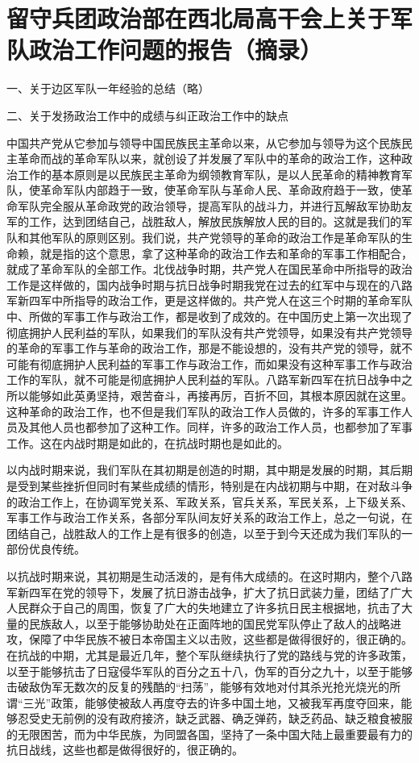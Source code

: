 \section[留守兵团政治部在西北局高干会上关于军队政治工作问题的报告（摘录）（一九四四年四月）]{留守兵团政治部在西北局高干会上关于军队政治工作问题的报告（摘录）}


一、关于边区军队一年经验的总结（略）

二、关于发扬政治工作中的成绩与纠正政治工作中的缺点

中国共产党从它参加与领导中国民族民主革命以来，从它参加与领导为这个民族民主革命而战的革命军队以来，就创设了并发展了军队中的革命的政治工作，这种政治工作的基本原则是以民族民主革命为纲领教育军队，是以人民革命的精神教育军队，使革命军队内部趋于一致，使革命军队与革命人民、革命政府趋于一致，使革命军队完全服从革命政党的政治领导，提高军队的战斗力，并进行瓦解敌军协助友军的工作，达到团结自己，战胜敌人，解放民族解放人民的目的。这就是我们的军队和其他军队的原则区别。我们说，共产党领导的革命的政治工作是革命军队的生命赖，就是指的这个意思，拿了这种革命的政治工作去和革命的军事工作相配合，就成了革命军队的全部工作。北伐战争时期，共产党人在国民革命中所指导的政治工作是这样做的，国内战争时期与抗日战争时期我党在过去的红军中与现在的八路军新四军中所指导的政治工作，更是这样做的。共产党人在这三个时期的革命军队中、所做的军事工作与政治工作，都是收到了成效的。在中国历史上第一次出现了彻底拥护人民利益的军队，如果我们的军队没有共产党领导，如果没有共产党领导的革命的军事工作与革命的政治工作，那是不能设想的，没有共产党的领导，就不可能有彻底拥护人民利益的军事工作与政治工作，而如果没有这种军事工作与政治工作的军队，就不可能是彻底拥护人民利益的军队。八路军新四军在抗日战争中之所以能够如此英勇坚持，艰苦奋斗，再接再厉，百折不回，其根本原因就在这里。这种革命的政治工作，也不但是我们军队的政治工作人员做的，许多的军事工作人员及其他人员也都参加了这种工作。同样，许多的政治工作人员，也都参加了军事工作。这在内战时期是如此的，在抗战时期也是如此的。

以内战时期来说，我们军队在其初期是创造的时期，其中期是发展的时期，其后期是受到某些挫折但同时有某些成绩的情形，特别是在内战初期与中期，在对敌斗争的政治工作上，在协调军党关系、军政关系，官兵关系，军民关系，上下级关系、军事工作与政治工作关系，各部分军队间友好关系的政治工作上，总之一句说，在团结自己，战胜敌人的工作上是有很多的创造，以至于到今天还成为我们军队的一部份优良传统。

以抗战时期来说，其初期是生动活泼的，是有伟大成绩的。在这时期内，整个八路军新四军在党的领导下，发展了抗日游击战争，扩大了抗日武装力量，团结了广大人民群众于自己的周围，恢复了广大的失地建立了许多抗日民主根据地，抗击了大量的民族敌人，以至于能够协助处在正面阵地的国民党军队停止了敌人的战略进攻，保障了中华民族不被日本帝国主义以击败，这些都是做得很好的，很正确的。在抗战的中期，尤其是最近几年，整个军队继续执行了党的路线与党的许多政策，以至于能够抗击了日寇侵华军队的百分之五十八，伪军的百分之九十，以至于能够击破敌伪军无数次的反复的残酷的“扫荡”，能够有效地对付其杀光抢光烧光的所谓“三光”政策，能够使被敌人再度夺去的许多中国土地，又被我军再度夺回来，能够忍受史无前例的没有政府接济，缺乏武器、确乏弹药，缺乏药品、缺乏粮食被服的无限困苦，而为中华民族，为同盟各国，坚持了一条中国大陆上最重要最有力的抗日战线，这些也都是做得很好的，很正确的。

